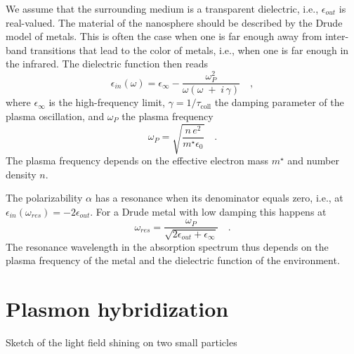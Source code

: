 We  assume that the surrounding  medium  is a transparent dielectric, i.e., 
$\epsilon_{out}$ is real-valued. The material of the nanosphere should be described by the Drude model of metals. This is often the case when one is far enough away from inter-band transitions that lead to the color of metals, i.e., when one is far enough in the infrared. The dielectric function then reads
\begin{equation}
 \epsilon_{in} (\omega) = \epsilon_{\infty} - \frac{\omega_P^2}{ \omega \left(\omega \;
+ \; i\, \gamma \right) } \quad , \label{eq:5_hybrid_drude}
\end{equation}
where $\epsilon_{\infty} $ is the  high-frequency limit,  $\gamma = 1 / \tau_\text{coll} $ the damping parameter of the plasma oscillation, and $\omega_P$ the plasma frequency 
\begin{equation}
\omega_P = \sqrt{\frac{n \, e^2}{m^\star \epsilon_0}} \quad.
\end{equation}
The plasma frequency depends on the effective electron mass $m^\star$ and number density $n$.

The polarizability $\alpha$ has a resonance when its denominator equals zero, i.e., at $\epsilon_{in} (\omega_{res}) = -2 \epsilon_{out}$. For a Drude metal with low damping this happens at
\begin{equation}
\omega_{res} = \frac{\omega_P}{\sqrt{2 \epsilon_{out} + \epsilon_\infty}} \quad .
\end{equation}
The resonance wavelength in the absorption spectrum thus depends on 
the plasma frequency of the metal and  the dielectric function of the environment. 




\section{Plasmon hybridization}

\begin{marginfigure}
\caption{Sketch of the light field shining on two small particles}
\end{marginfigure}


